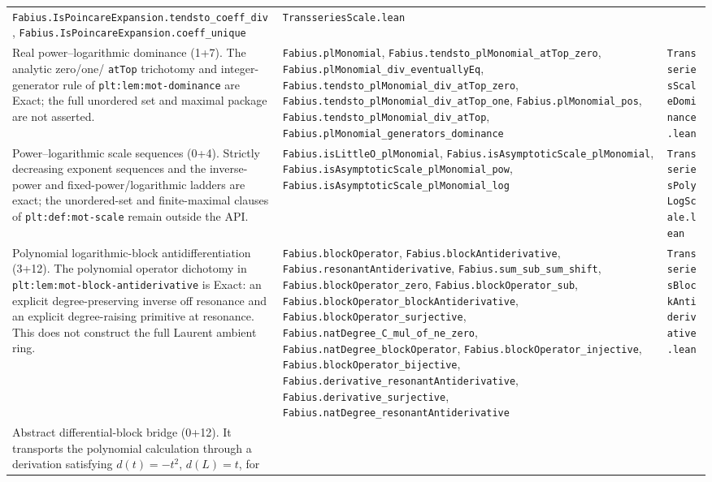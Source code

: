 \documentclass[11pt,oneside]{article}
\theoremstyle{definition}
\theoremstyle{remark}
\begin{document}
\begin{longtable}{@{}p{}p{}p{}@{}}
\nolinkurl{Fabius.IsPoincareExpansion.tendsto_coeff_div},
\nolinkurl{Fabius.IsPoincareExpansion.coeff_unique} &
\nolinkurl{TransseriesScale.lean} \\
Real power--logarithmic dominance (1+7).  The analytic zero/one/
\nolinkurl{atTop} trichotomy and integer-generator rule of
\nolinkurl{plt:lem:mot-dominance} are Exact; the full unordered set and maximal
package are not asserted. &
\nolinkurl{Fabius.plMonomial},
\nolinkurl{Fabius.tendsto_plMonomial_atTop_zero},
\nolinkurl{Fabius.plMonomial_div_eventuallyEq},
\nolinkurl{Fabius.tendsto_plMonomial_div_atTop_zero},
\nolinkurl{Fabius.tendsto_plMonomial_div_atTop_one},
\nolinkurl{Fabius.plMonomial_pos},
\nolinkurl{Fabius.tendsto_plMonomial_div_atTop},
\nolinkurl{Fabius.plMonomial_generators_dominance} &
\nolinkurl{TransseriesScaleDominance.lean} \\
Power--logarithmic scale sequences (0+4).  Strictly decreasing exponent
sequences and the inverse-power and fixed-power/logarithmic ladders are exact;
the unordered-set and finite-maximal clauses of
\nolinkurl{plt:def:mot-scale} remain outside the API. &
\nolinkurl{Fabius.isLittleO_plMonomial},
\nolinkurl{Fabius.isAsymptoticScale_plMonomial},
\nolinkurl{Fabius.isAsymptoticScale_plMonomial_pow},
\nolinkurl{Fabius.isAsymptoticScale_plMonomial_log} &
\nolinkurl{TransseriesPolyLogScale.lean} \\
Polynomial logarithmic-block antidifferentiation (3+12).  The polynomial
operator dichotomy in \nolinkurl{plt:lem:mot-block-antiderivative} is Exact:
an explicit degree-preserving inverse off resonance and an explicit
degree-raising primitive at resonance.  This does not construct the full
Laurent ambient ring. &
\nolinkurl{Fabius.blockOperator},
\nolinkurl{Fabius.blockAntiderivative},
\nolinkurl{Fabius.resonantAntiderivative},
\nolinkurl{Fabius.sum_sub_sum_shift},
\nolinkurl{Fabius.blockOperator_zero},
\nolinkurl{Fabius.blockOperator_sub},
\nolinkurl{Fabius.blockOperator_blockAntiderivative},
\nolinkurl{Fabius.blockOperator_surjective},
\nolinkurl{Fabius.natDegree_C_mul_of_ne_zero},
\nolinkurl{Fabius.natDegree_blockOperator},
\nolinkurl{Fabius.blockOperator_injective},
\nolinkurl{Fabius.blockOperator_bijective},
\nolinkurl{Fabius.derivative_resonantAntiderivative},
\nolinkurl{Fabius.derivative_surjective},
\nolinkurl{Fabius.natDegree_resonantAntiderivative} &
\nolinkurl{TransseriesBlockAntiderivative.lean} \\
Abstract differential-block bridge (0+12).  It transports the polynomial
calculation through a derivation satisfying \(d(t)=-t^{2}\), \(d(L)=t\), for

\end{longtable}
\end{document}
